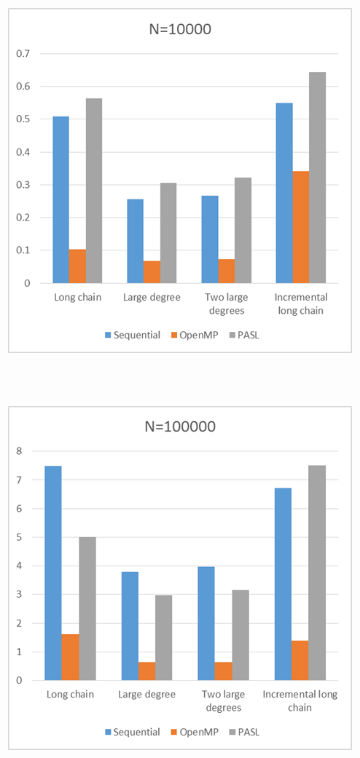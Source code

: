 \documentclass[specification,annotation]{itmo-student-thesis}
\begin{document}
\begin{figure}[!ht]
\centering
\begin{subfigure}[b]{0.45\textwidth}
    \includegraphics[width=\textwidth]{pic/results-8-a.png}
\end{subfigure}~~\begin{subfigure}[b]{0.45\textwidth}
    \includegraphics[width=\textwidth]{pic/results-8-b.png}

\end{subfigure}
\end{figure}
\end{document}
